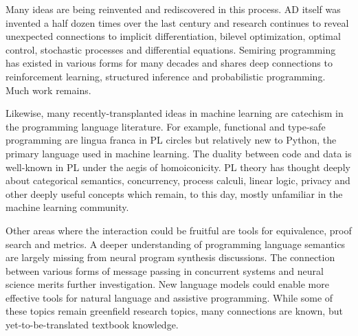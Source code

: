 \documentclass{article}
\begin{document}
    \begin{figure}[H]
        \centering
    \end{figure}

    Many ideas are being reinvented and rediscovered in this process. AD itself was invented a half dozen times over the last century and research continues to reveal unexpected connections to implicit differentiation, bilevel optimization, optimal control, stochastic processes and differential equations. Semiring programming has existed in various forms for many decades and shares deep connections to reinforcement learning, structured inference and probabilistic programming. Much work remains.

    Likewise, many recently-transplanted ideas in machine learning are catechism in the programming language literature. For example, functional and type-safe programming are lingua franca in PL circles but relatively new to Python, the primary language used in machine learning. The duality between code and data is well-known in PL under the aegis of homoiconicity. PL theory has thought deeply about categorical semantics, concurrency, process calculi, linear logic, privacy and other deeply useful concepts which remain, to this day, mostly unfamiliar in the machine learning community.


    Other areas where the interaction could be fruitful are tools for equivalence, proof search and metrics. A deeper understanding of programming language semantics are largely missing from neural program synthesis discussions. The connection between various forms of message passing in concurrent systems and neural science merits further investigation. New language models could enable more effective tools for natural language and assistive programming. While some of these topics remain greenfield research topics, many connections are known, but yet-to-be-translated textbook knowledge.
\end{document}
